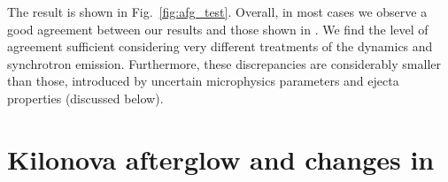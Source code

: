 The result is shown in Fig.~\ref{fig:afg_test}. Overall, in most cases we observe 
a good agreement between our results and those shown in \citep{Radice:2018pdn}. 
%
We find the level of agreement sufficient considering very different treatments 
of the \blast{} dynamics and synchrotron emission. Furthermore, these discrepancies 
are considerably smaller than those, introduced by uncertain microphysics parameters 
and ejecta properties (discussed below).




\section{Kilonova afterglow and changes in \GRB{}} \label{sec:afterglow:results}





